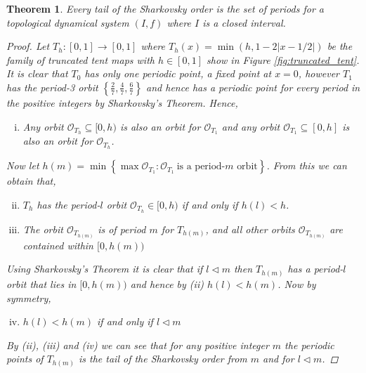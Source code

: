 \documentclass[11pt,a4paper,oneside]{memoir}
\theoremstyle{plain}
\newtheorem{thm}{Theorem}[chapter]
\theoremstyle{definition}
\begin{document}
\begin{thm}
    Every tail of the Sharkovsky order is the set of periods for a topological dynamical system $(I, f)$ where $I$ is a closed interval.
    \begin{proof}
        Let $T_h: [0, 1] \to [0, 1]$ where $T_h(x) = \min(h, 1-2|x-1/2|)$ be the family of truncated tent maps with $h \in [0, 1]$ show in Figure \ref{fig:truncated_tent}. It is clear that $T_0$ has only one periodic point, a fixed point at $x = 0$, however $T_1$ has the period-3 orbit $\left\lbrace \frac{2}{7}, \frac{4}{7}, \frac{6}{7} \right\rbrace$ and hence has a periodic point for every period in the positive integers by Sharkovsky's Theorem. Hence,
        \begin{enumerate}[(i)]
            \item Any orbit $\mathcal{O}_{T_h} \subseteq [0, h)$ is also an orbit for $\mathcal O_{T_1}$ and any orbit $\mathcal{O}_{T_1} \subseteq [0, h]$ is also an orbit for $\mathcal{O}_{T_h}$.
        \end{enumerate}
        Now let $h(m) = \min \left\lbrace \max \mathcal{O}_{T_1} : \mathcal{O}_{T_1} \ \text{is a period-$m$ orbit} \right\rbrace$. From this we can obtain that,
        
        \begin{enumerate}[(i)]\setcounter{enumi}{1}
            \item $T_h$ has the period-$l$ orbit $\mathcal{O}_{T_h} \in [0, h)$ if and only if $h(l) < h$.
            \item The orbit $\mathcal{O}_{T_{h(m)}}$ is of period $m$ for $T_{h(m)}$, and all other orbits $\mathcal{O}_{T_{h(m)}}$ are contained within $[0, h(m))$
        \end{enumerate}
        Using Sharkovsky's Theorem it is clear that if $l \lhd m$ then $T_{h(m)}$ has a period-$l$ orbit that lies in $[0, h(m))$ and hence by (ii) $h(l) < h(m)$. Now by symmetry,
        \begin{enumerate}[(i)]\setcounter{enumi}{3}
            \item $h(l) < h(m)$ if and only if $l \lhd m$
        \end{enumerate}
        By (ii), (iii) and (iv) we can see that for any positive integer $m$ the periodic points of $T_{h(m)}$ is the tail of the Sharkovsky order from $m$ and for $l \lhd m$.

    \end{proof}


\end{thm}
\end{document}
